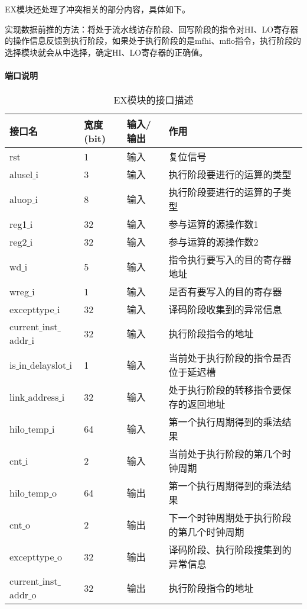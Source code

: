 EX模块还处理了冲突相关的部分内容，具体如下。

实现数据前推的方法：将处于流水线访存阶段、回写阶段的指令对HI、LO寄存器的操作信息反馈到执行阶段，如果处于执行阶段的是mfhi、mflo指令，执行阶段的选择模块就会从中选择，确定HI、LO寄存器的正确值。
\paragraph{端口说明}
\quad

\quad
\begin{table}[H]
	\centering
	\caption{EX模块的接口描述}
	\begin{tabular}{|l|l|l|l|}
		\hline
		接口名 & 宽度(bit) & 输入/输出 & 作用 \\
		\hline
		rst & 1 & 输入 & 复位信号 \\
		\hline
		alusel$\_$i & 3 & 输入 & 执行阶段要进行的运算的类型 \\
		\hline
		aluop$\_$i & 8 & 输入 & 执行阶段要进行的运算的子类型 \\
		\hline
		reg1$\_$i & 32 & 输入 & 参与运算的源操作数1 \\
		\hline
		reg2$\_$i & 32 & 输入 & 参与运算的源操作数2 \\
		\hline
		wd$\_$i & 5 & 输入 & 指令执行要写入的目的寄存器地址 \\
		\hline
		wreg$\_$i & 1 & 输入 & 是否有要写入的目的寄存器 \\
		\hline
		excepttype$\_$i & 32 & 输入 & 译码阶段收集到的异常信息 \\
		\hline
		current$\_$inst$\_$addr$\_$i & 32 & 输入 & 执行阶段指令的地址 \\
		\hline
		is$\_$in$\_$delayslot$\_$i & 1 & 输入 & 当前处于执行阶段的指令是否位于延迟槽 \\
		\hline
		link$\_$address$\_$i & 32 & 输入 & 处于执行阶段的转移指令要保存的返回地址 \\
		\hline
		hilo$\_$temp$\_$i & 64 & 输入 & 第一个执行周期得到的乘法结果 \\
		\hline
		cnt$\_$i & 2 & 输入 & 当前处于执行阶段的第几个时钟周期 \\
		\hline
		hilo$\_$temp$\_$o & 64 & 输出 & 第一个执行周期得到的乘法结果 \\
		\hline
		cnt$\_$o & 2 & 输出 & 下一个时钟周期处于执行阶段的第几个时钟周期 \\
		\hline
		excepttype$\_$o & 32 & 输出 & 译码阶段、执行阶段搜集到的异常信息 \\
		\hline
		current$\_$inst$\_$addr$\_$o & 32 & 输出 & 执行阶段指令的地址 \\

\end{tabular}
\end{table}
